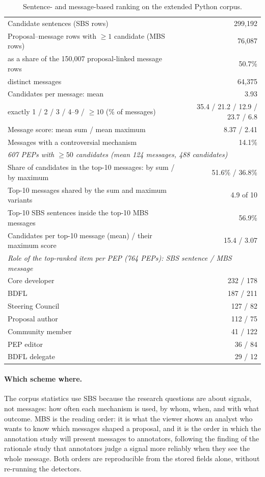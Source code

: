 \documentclass[sigconf,screen]{acmart}
\begin{document}
\begin{table}[t]
\caption{Sentence- and message-based ranking on the extended Python corpus.}
\label{tab:mbs}
\footnotesize
\setlength{\tabcolsep}{4pt}
\begin{tabular}{p{}r}
\toprule
Candidate sentences (SBS rows) & 299,192 \\
Proposal--message rows with $\geq 1$ candidate (MBS rows) & 76,087 \\
\quad as a share of the 150,007 proposal-linked message rows & 50.7\% \\
\quad distinct messages & 64,375 \\
Candidates per message: mean & 3.93 \\
\quad exactly 1 / 2 / 3 / 4--9 / $\geq 10$ (\% of messages) & 35.4 / 21.2 / 12.9 / 23.7 / 6.8 \\
Message score: mean sum / mean maximum & 8.37 / 2.41 \\
Messages with a controversial mechanism & 14.1\% \\
\midrule
\multicolumn{2}{l}{\emph{607 PEPs with $\geq 50$ candidates (mean 124 messages, 488 candidates)}} \\
Share of candidates in the top-10 messages: by sum / by maximum & 51.6\% / 36.8\% \\
Top-10 messages shared by the sum and maximum variants & 4.9 of 10 \\
Top-10 SBS sentences inside the top-10 MBS messages & 56.9\% \\
Candidates per top-10 message (mean) / their maximum score & 15.4 / 3.07 \\
\midrule
\multicolumn{2}{l}{\emph{Role of the top-ranked item per PEP (764 PEPs): SBS sentence / MBS message}} \\
Core developer & 232 / 178 \\
BDFL & 187 / 211 \\
Steering Council & 127 / 82 \\
Proposal author & 112 / 75 \\
Community member & 41 / 122 \\
PEP editor & 36 / 84 \\
BDFL delegate & 29 / 12 \\
\bottomrule
\end{tabular}
\end{table}

\paragraph{Which scheme where.} The corpus statistics use SBS because the research questions are about signals, not messages: how often each mechanism is used, by whom, when, and with what outcome. MBS is the reading order: it is what the viewer shows an analyst who wants to know which messages shaped a proposal, and it is the order in which the annotation study will present messages to annotators, following the finding of the rationale study that annotators judge a signal more reliably when they see the whole message. Both orders are reproducible from the stored fields alone, without re-running the detectors.
\end{document}
